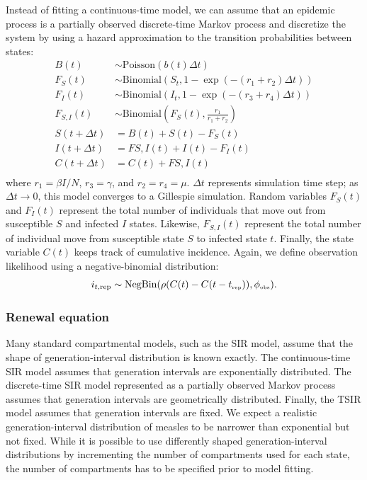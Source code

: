 \documentclass{article}
\newcommand{\tsub}[2]{#1_{{\textrm{\tiny #2}}}}
\begin{document}
Instead of fitting a continuous-time model, we can assume that an epidemic process is a partially observed discrete-time Markov process and discretize the system by using a hazard approximation to the transition probabilities between states:
\begin{equation}
\begin{aligned}
B(t) &\sim \mathrm{Poisson}(b(t) \Delta t)\\
F_{S}(t) &\sim \mathrm{Binomial}(S_t, 1 - \exp(- (r_1 + r_2) \Delta t))\\
F_{I}(t) &\sim \mathrm{Binomial}(I_t, 1 - \exp(- (r_3 + r_4) \Delta t))\\
F_{S,I}(t) &\sim \mathrm{Binomial}\left(F_{S}(t), \frac{r_1}{r_1 + r_2}\right)\\
S(t+\Delta t) &= B(t) + S(t) - F_{S}(t) \\
I(t+\Delta t) &= F{S,I}(t) + I(t) - F_{I}(t)\\
C(t+\Delta t) &= C(t) + F{S,I}(t)\\
\end{aligned}
\end{equation}
where $r_1 = \beta I/N$, $r_3 = \gamma$, and $r_2 = r_4 = \mu$.
$\Delta t$ represents simulation time step; as $\Delta t \to 0$, this model converges to a Gillespie simulation.
Random variables $F_S(t)$ and $F_I(t)$ represent the total number of individuals that move out from susceptible $S$ and infected $I$ states. 
Likewise, $F_{S, I}(t)$ represent the total number of individual move from susceptible state $S$ to infected state $t$.
Finally, the state variable $C(t)$ keeps track of cumulative incidence.
Again, we define observation likelihood using a negative-binomial distribution:
\begin{equation}
i_{t, {\tiny \textrm{rep}}} \sim \mathrm{NegBin}(\rho (C(t) - C(t - \tsub{t}{rep})) , \tsub{\phi}{obs}).
\end{equation}

\subsubsection*{Renewal equation}

Many standard compartmental models, such as the SIR model, assume that the shape of generation-interval distribution is known exactly.
The continuous-time SIR model assumes that generation intervals are exponentially distributed.
The discrete-time SIR model represented as a partially observed Markov process assumes that generation intervals are geometrically distributed.
Finally, the TSIR model assumes that generation intervals are fixed.
We expect a realistic generation-interval distribution of measles to be narrower than exponential but not fixed.
While it is possible to use differently shaped generation-interval distributions by incrementing the number of compartments used for each state, the number of compartments has to be specified prior to model fitting.
\end{document}
